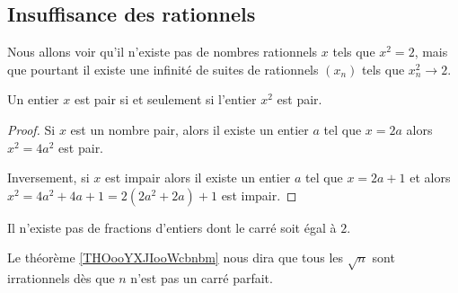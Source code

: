 \subsection{Insuffisance des rationnels}

Nous allons voir qu'il n'existe pas de nombres rationnels \( x\) tels que \( x^2=2\), mais que pourtant il existe une infinité de suites de rationnels \( (x_n)\) tels que \(  x_n^2\to 2  \).

\begin{lemma}       \label{LemJPIUooWFHaFM}
    Un entier \( x\) est pair si et seulement si l'entier \( x^2\) est pair.
\end{lemma}

\begin{proof}
    Si \( x\) est un nombre pair, alors il existe un entier \( a\) tel que \( x=2a\) alors \( x^2=4a^2\) est pair.

    Inversement, si \( x\) est impair alors il existe un entier \( a\) tel que \( x=2a+1\) et alors \( x^2=4a^2+4a+1=2(2a^2+2a)+1\) est impair.
\end{proof}

\begin{proposition}     \label{PropooRJMSooPrdeJb}
    Il n'existe pas de fractions d'entiers dont le carré soit égal à \( 2\).
\end{proposition}
Le théorème \ref{THOooYXJIooWcbnbm} nous dira que tous les \( \sqrt{n}\) sont irrationnels dès que \( n\) n'est pas un carré parfait.

